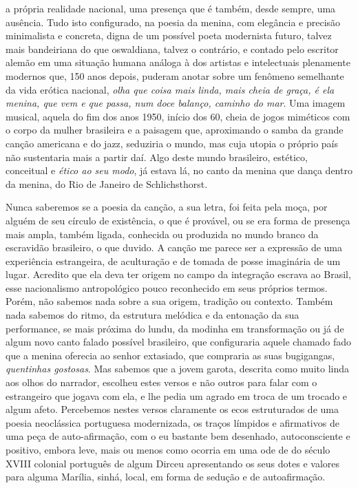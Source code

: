 a própria realidade nacional, uma presença que é também, desde sempre,
uma ausência. Tudo isto configurado, na poesia da menina, com elegância
e precisão minimalista e concreta, digna de um possível poeta modernista
futuro, talvez mais bandeiriana do que oswaldiana, talvez o contrário, e
contado pelo escritor alemão em uma situação humana análoga à dos
artistas e intelectuais plenamente modernos que, 150 anos depois,
puderam anotar sobre um fenômeno semelhante da vida erótica nacional,
\emph{olha que coisa mais linda, mais cheia de graça, é ela menina, que
vem e que passa, num doce balanço, caminho do mar}. Uma imagem musical,
aquela do fim dos anos 1950, início dos 60, cheia de jogos miméticos com
o corpo da mulher brasileira e a paisagem que, aproximando o samba da
grande canção americana e do jazz, seduziria o mundo, mas cuja utopia o
próprio país não sustentaria mais a partir daí. Algo deste mundo
brasileiro, estético, conceitual e \emph{ético ao seu modo}, já estava
lá, no canto da menina que dança dentro da menina, do Rio de Janeiro de
Schlichsthorst.

Nunca saberemos se a poesia da canção, a sua letra, foi feita pela moça,
por alguém de seu círculo de existência, o que é provável, ou se era
forma de presença mais ampla, também ligada, conhecida ou produzida no
mundo branco da escravidão brasileiro, o que duvido. A canção me parece
ser a expressão de uma experiência estrangeira, de aculturação e de
tomada de posse imaginária de um lugar. Acredito que ela deva ter origem
no campo da integração escrava ao Brasil, esse nacionalismo
antropológico pouco reconhecido em seus próprios termos. Porém, não
sabemos nada sobre a sua origem, tradição ou contexto. Também nada
sabemos do ritmo, da estrutura melódica e da entonação da sua
performance, se mais próxima do lundu, da modinha em transformação ou já
de algum novo canto falado possível brasileiro, que configuraria aquele
chamado fado que a menina oferecia ao senhor extasiado, que compraria as
suas bugigangas, \emph{quentinhas gostosas}. Mas sabemos que a jovem
garota, descrita como muito linda aos olhos do narrador, escolheu estes
versos e não outros para falar com o estrangeiro que jogava com ela, e
lhe pedia um agrado em troca de um trocado e algum afeto. Percebemos
nestes versos claramente os ecos estruturados de uma poesia neoclássica
portuguesa modernizada, os traços límpidos e afirmativos de uma peça de
auto-afirmação, com o eu bastante bem desenhado, autoconsciente e
positivo, embora leve, mais ou menos como ocorria em uma ode de do
século XVIII colonial português de algum Dirceu apresentando os seus
dotes e valores para alguma Marília, sinhá, local, em forma de sedução e
de autoafirmação.

